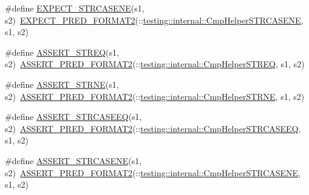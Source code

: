 \begin{DoxyCompactItemize}
\item 
\#define \mbox{\hyperlink{_obj__test_2lib_2googletest-master_2googletest_2include_2gtest_2gtest_8h_a07d0b5cbd3b5f7c8b6f44c609046ff07}{E\+X\+P\+E\+C\+T\+\_\+\+S\+T\+R\+C\+A\+S\+E\+NE}}(s1,  s2)~\mbox{\hyperlink{_obj__test_2lib_2googletest-release-1_88_81_2googletest_2include_2gtest_2gtest__pred__impl_8h_af0141918615a5e2d5247e9cda8324dae}{E\+X\+P\+E\+C\+T\+\_\+\+P\+R\+E\+D\+\_\+\+F\+O\+R\+M\+A\+T2}}(\+::\mbox{\hyperlink{namespacetesting_1_1internal_a7e31d489f06ab8f6a81a7729f0c377e7}{testing\+::internal\+::\+Cmp\+Helper\+S\+T\+R\+C\+A\+S\+E\+NE}}, s1, s2)
\item 
\#define \mbox{\hyperlink{_obj__test_2lib_2googletest-master_2googletest_2include_2gtest_2gtest_8h_a74f4189ea570bab9a65d47104659ef9c}{A\+S\+S\+E\+R\+T\+\_\+\+S\+T\+R\+EQ}}(s1,  s2)~\mbox{\hyperlink{_obj__test_2lib_2googletest-release-1_88_81_2googletest_2include_2gtest_2gtest__pred__impl_8h_ac452685a1a98ea3d96eb956a062ee210}{A\+S\+S\+E\+R\+T\+\_\+\+P\+R\+E\+D\+\_\+\+F\+O\+R\+M\+A\+T2}}(\+::\mbox{\hyperlink{namespacetesting_1_1internal_a711a396ed8f636ecd14a850a89d181b6}{testing\+::internal\+::\+Cmp\+Helper\+S\+T\+R\+EQ}}, s1, s2)
\item 
\#define \mbox{\hyperlink{_obj__test_2lib_2googletest-master_2googletest_2include_2gtest_2gtest_8h_a3d679660ac1b2f9f6e6c7608452af923}{A\+S\+S\+E\+R\+T\+\_\+\+S\+T\+R\+NE}}(s1,  s2)~\mbox{\hyperlink{_obj__test_2lib_2googletest-release-1_88_81_2googletest_2include_2gtest_2gtest__pred__impl_8h_ac452685a1a98ea3d96eb956a062ee210}{A\+S\+S\+E\+R\+T\+\_\+\+P\+R\+E\+D\+\_\+\+F\+O\+R\+M\+A\+T2}}(\+::\mbox{\hyperlink{namespacetesting_1_1internal_af2d31c77ce73e1003a64bd7ca3564bbe}{testing\+::internal\+::\+Cmp\+Helper\+S\+T\+R\+NE}}, s1, s2)
\item 
\#define \mbox{\hyperlink{_obj__test_2lib_2googletest-master_2googletest_2include_2gtest_2gtest_8h_a58847dd696200a3268361401dfcd0fa0}{A\+S\+S\+E\+R\+T\+\_\+\+S\+T\+R\+C\+A\+S\+E\+EQ}}(s1,  s2)~\mbox{\hyperlink{_obj__test_2lib_2googletest-release-1_88_81_2googletest_2include_2gtest_2gtest__pred__impl_8h_ac452685a1a98ea3d96eb956a062ee210}{A\+S\+S\+E\+R\+T\+\_\+\+P\+R\+E\+D\+\_\+\+F\+O\+R\+M\+A\+T2}}(\+::\mbox{\hyperlink{namespacetesting_1_1internal_a30dfeb01f1bc8087c7d05205d5fa75c1}{testing\+::internal\+::\+Cmp\+Helper\+S\+T\+R\+C\+A\+S\+E\+EQ}}, s1, s2)
\item 
\#define \mbox{\hyperlink{_obj__test_2lib_2googletest-master_2googletest_2include_2gtest_2gtest_8h_ac3d2c3836b103068a050f32585b2aaad}{A\+S\+S\+E\+R\+T\+\_\+\+S\+T\+R\+C\+A\+S\+E\+NE}}(s1,  s2)~\mbox{\hyperlink{_obj__test_2lib_2googletest-release-1_88_81_2googletest_2include_2gtest_2gtest__pred__impl_8h_ac452685a1a98ea3d96eb956a062ee210}{A\+S\+S\+E\+R\+T\+\_\+\+P\+R\+E\+D\+\_\+\+F\+O\+R\+M\+A\+T2}}(\+::\mbox{\hyperlink{namespacetesting_1_1internal_a7e31d489f06ab8f6a81a7729f0c377e7}{testing\+::internal\+::\+Cmp\+Helper\+S\+T\+R\+C\+A\+S\+E\+NE}}, s1, s2)

\end{DoxyCompactItemize}
